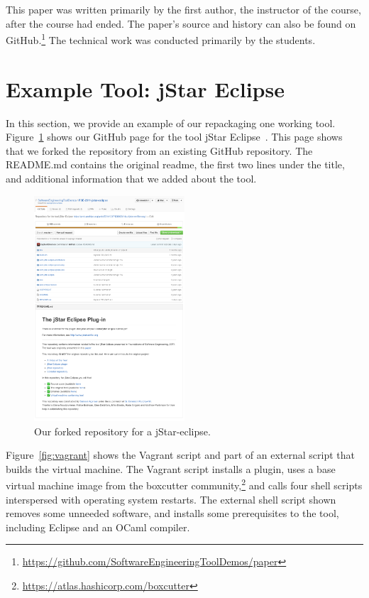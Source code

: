 \documentclass[10pt,conference]{IEEEtran}
\begin{document}
This paper was written primarily by the first author,
the instructor of the course, after the course 
had ended.
The paper's source and history can also be found 
on GitHub.\footnote{\url{https://github.com/SoftwareEngineeringToolDemos/paper}}
The technical work was conducted primarily by the students.

\section{Example Tool: jStar Eclipse}

In this section, we provide an example of our repackaging 
one working tool.
Figure~\ref{fig:jstar} shows our GitHub page for
the tool jStar Eclipse~\cite{jstar}.
This page shows that we forked
the repository from an existing GitHub repository.
The README.md contains the original readme,
the first two lines under the title,
and additional information that we added about the tool.


\begin{figure}[t]
  \centering
    \includegraphics[width=0.5\textwidth]{jstar.png}
  \caption{Our forked repository for a jStar-eclipse.}\label{fig:jstar}
\end{figure}

Figure~\ref{fig:vagrant} shows the Vagrant script and 
part of an external script that builds the virtual machine.
The Vagrant script installs a plugin, 
uses a base virtual machine image from the boxcutter 
community,\footnote{\url{https://atlas.hashicorp.com/boxcutter}}
and calls four shell scripts interspersed with operating system 
restarts.
The external shell script shown removes some unneeded software,
and installs some prerequisites to the tool, including Eclipse and
an OCaml compiler. 
\end{document}

